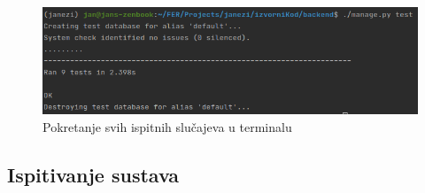 			\begin{figure}[H]
				\centering
				\includegraphics[scale=0.65]{slike/TestsTerminal.PNG}
				\caption{Pokretanje svih ispitnih slučajeva u terminalu}
				\label{fig:TestsTerminal}
			\end{figure}
			
			
			\subsection{Ispitivanje sustava}
